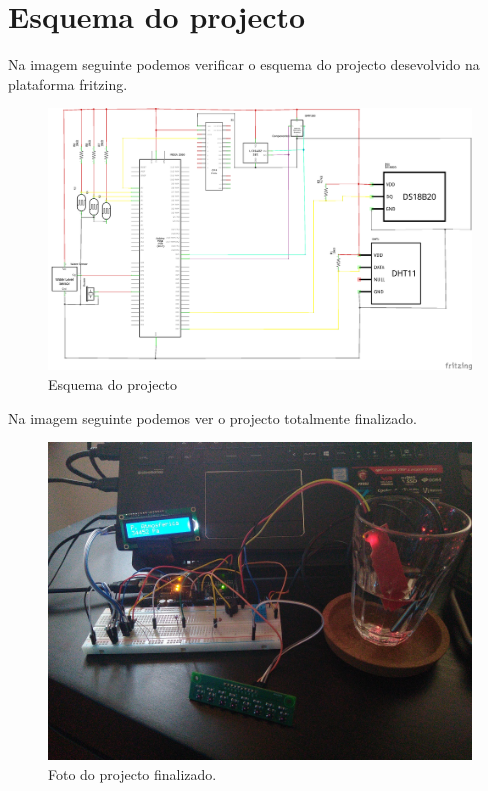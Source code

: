 \documentclass[11pt]{report}
\begin{document}
\chapter*{Esquema do projecto}

Na imagem seguinte podemos verificar o esquema do projecto desevolvido na plataforma fritzing.

\begin{figure} [!h]
\centering
\includegraphics[width=\textwidth]{Prints/esquema.png}
\caption{Esquema do projecto}
\label{Rotulo}
\end{figure}

\newpage
Na imagem seguinte podemos ver o projecto totalmente finalizado.

\begin{figure} [!h]
\centering
\includegraphics[width=\textwidth]{Prints/projecto.png}
\caption{Foto do projecto finalizado.}
\label{Rotulo}
\end{figure}
\end{document}
